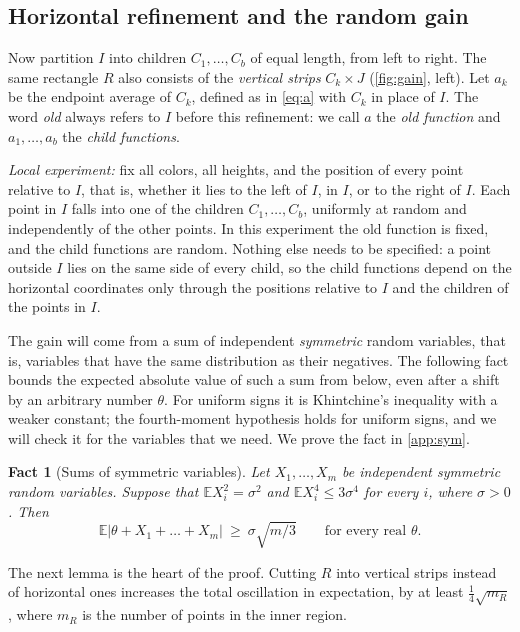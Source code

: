 \documentclass[11pt,letterpaper]{article}
\newtheorem{fact}[theorem]{Fact}
\newcommand{\E}{\mathbb{E}}
\newcommand{\1}{\mathbf{1}}
\begin{document}
\subsection{Horizontal refinement and the random gain}\label{sec:onerect}

Now partition $I$ into children $C_1,\dots,C_b$ of equal length, from left to right. The same rectangle $R$ also consists of the \emph{vertical strips} $C_k\times J$ (\cref{fig:gain}, left). Let $a_k$ be the endpoint average of $C_k$, defined as in \eqref{eq:a} with $C_k$ in place of $I$. The word \emph{old} always refers to $I$ before this refinement: we call $a$ the \emph{old function} and $a_1,\dots,a_b$ the \emph{child functions}.

\emph{Local experiment:} fix all colors, all heights, and the position of every point relative to $I$, that is, whether it lies to the left of $I$, in $I$, or to the right of $I$. Each point in $I$ falls into one of the children $C_1,\dots,C_b$, uniformly at random and independently of the other points. In this experiment the old function is fixed, and the child functions are random. Nothing else needs to be specified: a point outside $I$ lies on the same side of every child, so the child functions depend on the horizontal coordinates only through the positions relative to $I$ and the children of the points in $I$.

The gain will come from a sum of independent \emph{symmetric} random variables, that is, variables that have the same distribution as their negatives. The following fact bounds the expected absolute value of such a sum from below, even after a shift by an arbitrary number $\theta$. For uniform signs it is Khintchine's inequality with a weaker constant; the fourth-moment hypothesis holds for uniform signs, and we will check it for the variables that we need. We prove the fact in \cref{app:sym}.

\begin{fact}[Sums of symmetric variables]\label{fact:sym}
Let $X_1,\dots,X_m$ be independent symmetric random variables. Suppose that $\E X_i^2=\sigma^2$ and $\E X_i^4\le3\sigma^4$ for every $i$, where $\sigma>0$. Then
\[
\E|\theta+X_1+\dots+X_m|\ \ge\ \sigma\sqrt{m/3}\qquad\text{for every real }\theta.
\]
\end{fact}

The next lemma is the heart of the proof. Cutting $R$ into vertical strips instead of horizontal ones increases the total oscillation in expectation, by at least $\frac14\sqrt{m_R}$, where $m_R$ is the number of points in the inner region.
\end{document}
